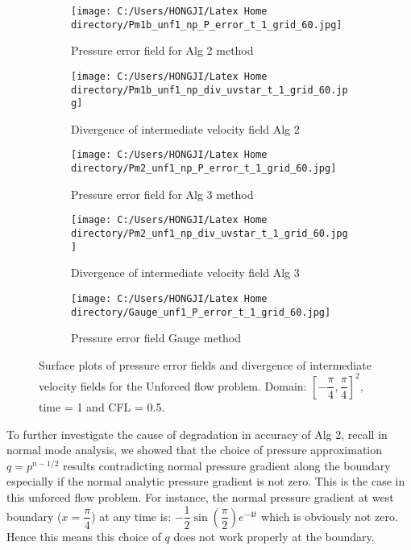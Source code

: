 \begin{figure}[H]
	\centering
	\begin{subfigure}[t]{2.2in}
		\centering
		\texttt{[image: C:/Users/HONGJI/Latex Home directory/Pm1b\_unf1\_np\_P\_error\_t\_1\_grid\_60.jpg]}
		\caption{Pressure error field for Alg 2 method}\label{fig:6.15a}		
	\end{subfigure}
	\quad
	\begin{subfigure}[t]{2.6in}
		\centering
		\texttt{[image: C:/Users/HONGJI/Latex Home directory/Pm1b\_unf1\_np\_div\_uvstar\_t\_1\_grid\_60.jpg]}
		\caption{Divergence of intermediate velocity field Alg 2}\label{fig:6.15b}
	\end{subfigure}
	\quad
	\centering
	\begin{subfigure}[t]{2.2in}
		\centering
		\texttt{[image: C:/Users/HONGJI/Latex Home directory/Pm2\_unf1\_np\_P\_error\_t\_1\_grid\_60.jpg]}
		\caption{Pressure error field for Alg 3 method}\label{fig:6.15c}		
	\end{subfigure}
	\quad
	\begin{subfigure}[t]{2.5in}
		\centering
		\texttt{[image: C:/Users/HONGJI/Latex Home directory/Pm2\_unf1\_np\_div\_uvstar\_t\_1\_grid\_60.jpg]}
		\caption{Divergence of intermediate velocity field Alg 3}\label{fig:6.15d}
	\end{subfigure}
	\quad
	\begin{subfigure}[t]{2.5in}
		\centering
		\texttt{[image: C:/Users/HONGJI/Latex Home directory/Gauge\_unf1\_P\_error\_t\_1\_grid\_60.jpg]}
		\caption{Pressure error field Gauge method }\label{fig:6.15e}
	\end{subfigure}
	\caption{Surface plots of pressure error fields and divergence of intermediate velocity fields for the Unforced flow problem. Domain: $[-\dfrac{\pi}{4}, \dfrac{\pi}{4}]^2$, time = 1 and CFL = 0.5.}\label{fig:6.15}
\end{figure}

To further investigate the cause of degradation in accuracy of Alg 2, recall in normal mode analysis, we showed that the choice of pressure approximation $q = p^{n-1/2}$ results contradicting normal pressure gradient along the boundary especially if the normal analytic pressure gradient is not zero. This is the case in this unforced flow problem. For instance, the normal pressure gradient at west boundary ($x=\dfrac{\pi}{4}$) at any time is: $-\dfrac{1}{2}\sin(\dfrac{\pi}{2})e^{-4t}$ which is obviously not zero. Hence this means this choice of $q$ does not work properly at the boundary.\\

